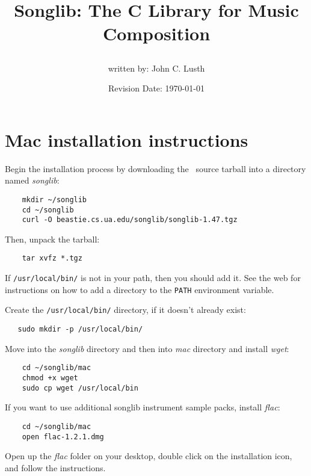 \documentclass{article}
\title{Songlib: The C Library for Music Composition\\
\date{Revision Date: \today}}
\author{written by: John C. Lusth}
\begin{document}
\maketitle

\W\subsubsection*{}
\W\htmlrule

\section*{Mac installation instructions}

Begin the installation process by downloading the \songlib\ source
tarball into a directory named {\it songlib}:

\begin{verbatim}
    mkdir ~/songlib
    cd ~/songlib
    curl -O beastie.cs.ua.edu/songlib/songlib-1.47.tgz
\end{verbatim}

Then, unpack the tarball:

\begin{verbatim}
    tar xvfz *.tgz
\end{verbatim}

If \verb!/usr/local/bin/! is not in your path, then you
should add it. See the web for instructions on how to add
a directory to the \verb!PATH! environment variable.

Create the \verb!/usr/local/bin/! directory, if it doesn't already exist:

\begin{verbatim}
   sudo mkdir -p /usr/local/bin/
\end{verbatim}

Move into the {\it songlib} directory and then
into {\it mac} directory and install {\it wget}:

\begin{verbatim}
    cd ~/songlib/mac
    chmod +x wget
    sudo cp wget /usr/local/bin
\end{verbatim}

If you want to use additional songlib instrument sample packs,
install {\it flac}:

\begin{verbatim}
    cd ~/songlib/mac
    open flac-1.2.1.dmg
\end{verbatim}

Open up the {\it flac} folder on your desktop, double click on the installation
icon, and follow the instructions.
\end{document}
